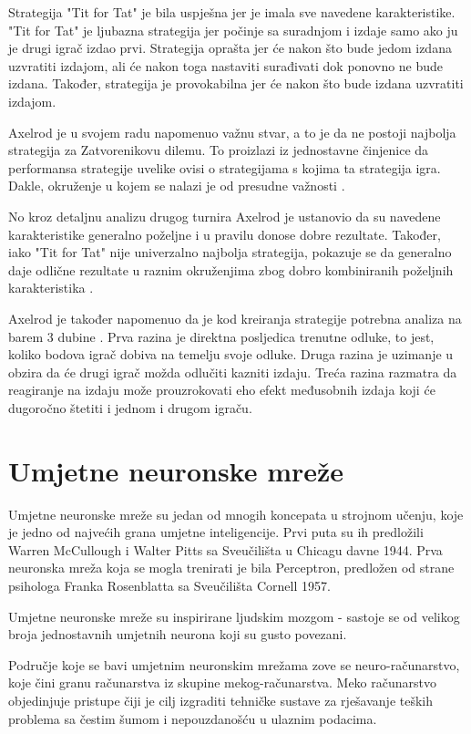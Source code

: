 \documentclass[zavrsnirad]{fer}
\begin{document}
		Strategija "Tit for Tat" je bila uspješna jer je imala sve navedene karakteristike. "Tit for Tat" je ljubazna strategija jer počinje sa suradnjom i izdaje samo ako ju je drugi igrač izdao prvi. Strategija oprašta jer će nakon što bude jedom izdana uzvratiti izdajom, ali će nakon toga nastaviti surađivati dok ponovno ne bude izdana. Također, strategija je provokabilna jer će nakon što bude izdana uzvratiti izdajom.
	
		Axelrod je u svojem radu napomenuo važnu stvar, a to je da ne postoji najbolja strategija za Zatvorenikovu dilemu. To proizlazi iz jednostavne činjenice da performansa strategije uvelike ovisi o strategijama s kojima ta strategija igra. Dakle, okruženje u kojem se nalazi je od presudne važnosti \cite{1980Axelrod1}.
	
		No kroz detaljnu analizu drugog turnira Axelrod je ustanovio da su navedene karakteristike generalno poželjne i u pravilu donose dobre rezultate. Također, iako "Tit for Tat" nije univerzalno najbolja strategija, pokazuje se da generalno daje odlične rezultate u raznim okruženjima zbog dobro kombiniranih poželjnih karakteristika \cite{1980Axelrod2}.
	
		Axelrod je također napomenuo da je kod kreiranja strategije potrebna analiza na barem 3 dubine \cite{1980Axelrod1}. Prva razina je direktna posljedica trenutne odluke, to jest, koliko bodova igrač dobiva na temelju svoje odluke. Druga razina je uzimanje u obzira da će drugi igrač možda odlučiti kazniti izdaju. Treća razina razmatra da reagiranje na izdaju može prouzrokovati eho efekt međusobnih izdaja koji će dugoročno štetiti i jednom i drugom igraču.

\chapter{Umjetne neuronske mreže}
	
	Umjetne neuronske mreže su jedan od mnogih koncepata u strojnom učenju, koje je jedno od najvećih grana umjetne inteligencije. Prvi puta su ih predložili Warren McCullough i Walter Pitts sa Sveučilišta u Chicagu davne 1944. Prva neuronska mreža koja se mogla trenirati je bila Perceptron, predložen od strane psihologa Franka Rosenblatta sa Sveučilišta Cornell 1957. \cite{MITNeuralNet}
	
	Umjetne neuronske mreže su inspirirane ljudskim mozgom - sastoje se od velikog broja jednostavnih umjetnih neurona koji su gusto povezani. \cite{MITNeuralNet}
	
	Područje koje se bavi umjetnim neuronskim mrežama zove se neuro-računarstvo, koje čini granu računarstva iz skupine mekog-računarstva. Meko računarstvo objedinjuje pristupe čiji je cilj izgraditi tehničke sustave za rješavanje teških problema sa čestim šumom i nepouzdanošću u ulaznim podacima. \cite{skriptaNeuronskeMreze} 
	
\end{document}
